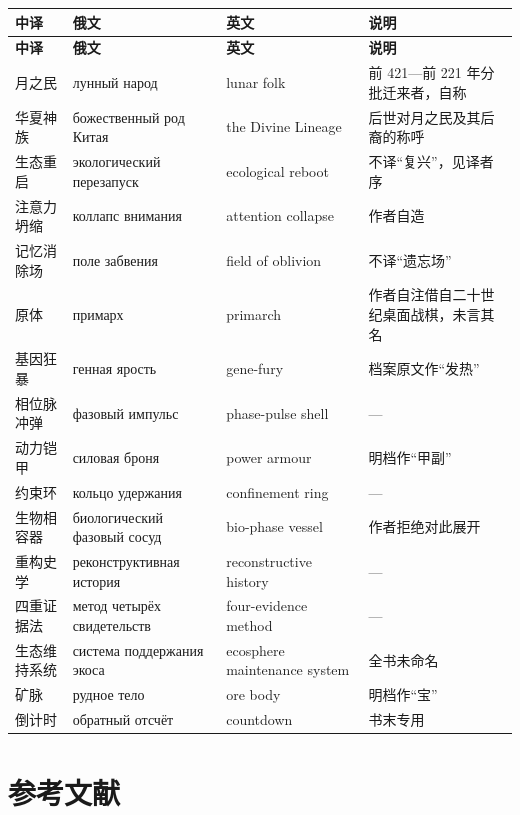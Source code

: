 \vspace{2mm}
{\footnotesize
\renewcommand{\arraystretch}{1.10}
\begin{longtable}{@{}p{23mm}p{34mm}p{36mm}p{34mm}@{}}
\toprule
\textbf{中译} & \textbf{俄文} & \textbf{英文} & \textbf{说明}\\
\midrule
\endfirsthead
\toprule
\textbf{中译} & \textbf{俄文} & \textbf{英文} & \textbf{说明}\\
\midrule
\endhead
\bottomrule
\endfoot
月之民 & лунный народ & lunar folk & 前 421—前 221 年分批迁来者，自称\\
华夏神族 & божественный род Китая & the Divine Lineage & 后世对月之民及其后裔的称呼\\
生态重启 & экологический перезапуск & ecological reboot & 不译“复兴”，见译者序\\
注意力坍缩 & коллапс внимания & attention collapse & 作者自造\\
记忆消除场 & поле забвения & field of oblivion & 不译“遗忘场”\\
原体 & примарх & primarch & 作者自注借自二十世纪桌面战棋，未言其名\\
基因狂暴 & генная ярость & gene-fury & 档案原文作“发热”\\
相位脉冲弹 & фазовый импульс & phase-pulse shell & —\\
动力铠甲 & силовая броня & power armour & 明档作“甲副”\\
约束环 & кольцо удержания & confinement ring & —\\
生物相容器 & биологический фазовый сосуд & bio-phase vessel & 作者拒绝对此展开\\
重构史学 & реконструктивная история & reconstructive history & —\\
四重证据法 & метод четырёх свидетельств & four-evidence method & —\\
生态维持系统 & система поддержания экоса & ecosphere maintenance system & 全书未命名\\
矿脉 & рудное тело & ore body & 明档作“宝”\\
倒计时 & обратный отсчёт & countdown & 书末专用\\
\bottomrule
\end{longtable}
}

\clearpage
\chapter*{参考文献}

